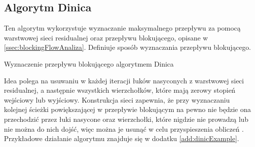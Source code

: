 \subsection{Algorytm Dinica}\label{ssec:dinicAnaliza}
Ten algorytm wykorzystuje wyznaczanie maksymalnego przepływu za pomocą warstwowej sieci residualnej oraz przepływu blokującego, opisane w \ref{ssec:blockingFlowAnaliza}. Definiuje sposób wyznaczania przepływu blokującego.
\begin{algorithm}[H]
	\caption{Wyznaczenie przepływu blokującego algorytmem Dinica}\label{dinicPseudo}
	\begin{algorithmic}
					\EndIf
				\EndFor
			\EndWhile{}
		\EndProcedure
	\end{algorithmic}
\end{algorithm}\noindent
Idea polega na usuwaniu w każdej iteracji łuków nasyconych z warstwowej sieci residualnej, a następnie wszystkich wierzchołków, które mają zerowy stopień wejściowy lub wyjściowy. Konstrukcja sieci zapewnia, że przy wyznaczaniu kolejnej ścieżki powiększającej w przepływie blokującym na pewno nie będzie ona przechodzić przez łuki nasycone oraz wierzchołki, które nigdzie nie prowadzą lub nie można do nich dojść, więc można je usunąć w celu przyspieszenia obliczeń \cite{id:ZaawansowaneAlgorytmy}. Przykładowe działanie algorytmu znajduje się w dodatku \ref{add:dinicExample}.
